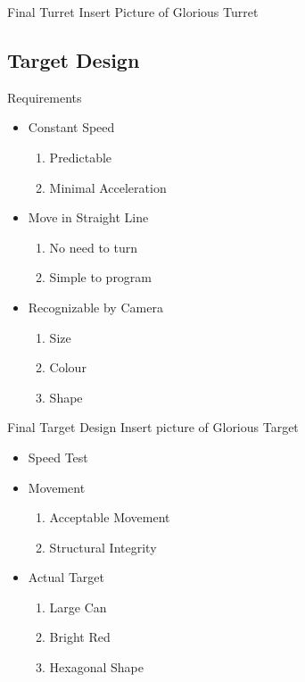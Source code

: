 \begin{frame}{Final Turret}
Insert Picture of Glorious Turret
\end{frame}

\subsection{Target Design}
\begin{frame}{Requirements}
\begin{itemize}
    \item Constant Speed
    	\begin{enumerate}
    	    \item Predictable 
  			\item Minimal Acceleration
		\end{enumerate}
    \item Move in Straight Line
    	\begin{enumerate}
  			\item No need to turn
  			\item Simple to program
		\end{enumerate}
    \item Recognizable by Camera
    	\begin{enumerate}
  			\item Size
  			\item Colour
  			\item Shape
		\end{enumerate}
\end{itemize}
\end{frame}

\begin{frame}{Final Target Design}
Insert picture of Glorious Target 
\begin{itemize}
    \item Speed Test
    \item Movement
    	\begin{enumerate}
  			\item Acceptable Movement
  			\item Structural Integrity
		\end{enumerate}
	\item Actual Target
		\begin{enumerate}
  			\item Large Can
  			\item Bright Red
  			\item Hexagonal Shape
		\end{enumerate}
\end{itemize}
\end{frame}








